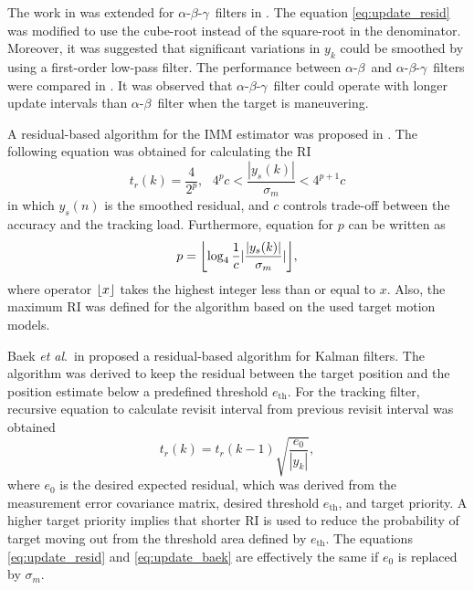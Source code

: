 \documentclass[english, 12pt, a4paper, elec, utf8, a-1b, online]{aaltothesis}
\numberwithin{equation}{section}
\newcommand{\etal}{\textit{et al}.~}
\newcommand{\ri}{t_r}
\DeclarePairedDelimiter\floor{\lfloor}{\rfloor}
\begin{document}
\newcommand{\abg}{$\alpha$-$\beta$-$\gamma$~}
\newcommand{\ab}{$\alpha$-$\beta$~}


The work in \cite{Cohen1986} was extended for \abg filters \cite{Brookner1998} in \cite{Gardner1988}. 
The equation \eqref{eq:update_resid} was modified to use the cube-root instead of the square-root in the denominator.
Moreover, it was suggested that significant variations in $y_k$ could be smoothed by using a first-order low-pass filter.
The performance between \ab and \abg filters were compared in \cite{Munu1992}.
It was observed that \abg filter could operate with longer update intervals than \ab filter when the target is maneuvering.

A residual-based algorithm for the IMM estimator was proposed in \cite{ChengTing2007}.
The following equation was obtained for calculating the RI
\begin{equation}
    \ri(k) = \frac{4}{2^p}, \text{ } 4^p c < \frac{|y_s(k)|}{\sigma_m} < 4^{p+1}c
\end{equation}
in which $y_s(n)$ is the smoothed residual, and $c$ controls trade-off between the accuracy and the tracking load.
Furthermore, equation for $p$ can be written as
\begin{equation}
    p = \floor*{\log_4\frac{1}{c}|\frac{|y_s(k)|}{\sigma_m}|},
\end{equation}
where operator $\floor*{x}$ takes the highest integer less than or equal to $x$.
Also, the maximum RI was defined for the algorithm based on the used target motion models.

Baek \etal in \cite{Baek2010} proposed a residual-based algorithm for Kalman filters.
The algorithm was derived to keep the residual between the target position and the position estimate below a predefined threshold $e_\text{th}$.
For the tracking filter, recursive equation to calculate revisit interval from previous revisit interval was obtained
\begin{equation}\label{eq:update_baek}
    \ri(k) = \ri(k - 1) \sqrt{\frac{e_0}{|y_k|}},
\end{equation}
where $e_0$ is the desired expected residual, which was derived from the measurement error covariance matrix, desired threshold $e_\text{th}$, and target priority.
A higher target priority implies that shorter RI is used to reduce the probability of target moving out from the threshold area defined by $e_\text{th}$.
The equations \eqref{eq:update_resid} and \eqref{eq:update_baek} are effectively the same if $e_0$ is replaced by $\sigma_m$.
\end{document}
